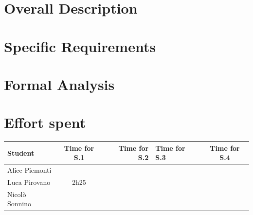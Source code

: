 \documentclass[12pt]{article}
\begin{document}
\section{Overall Description}
\newpage
\section{Specific Requirements}
\newpage
\section{Formal Analysis}
\newpage
\section{Effort spent}
\begin{tabular}{ | l || c | r | l | c |}
    \hline
    Student        & Time for S.1 & Time for S.2 & Time for S.3 & Time for S.4 \\ \hline
    Alice Piemonti &              &              &              &              \\ \hline
    Luca Pirovano  & 2h25         &              &              &              \\ \hline
    Nicolò Sonnino &              &              &              &              \\
    \hline
\end{tabular}
\end{document}
